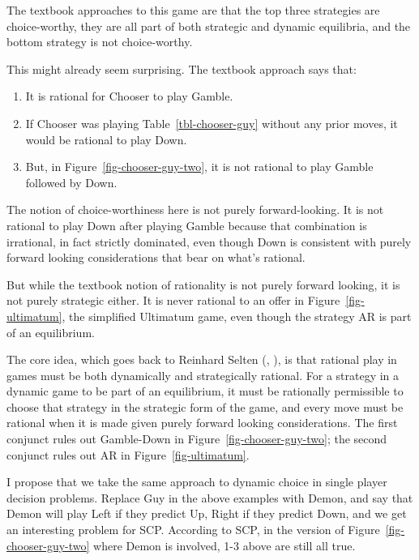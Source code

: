 \documentclass[
  11pt,
  letterpaper,
  DIV=11,
  numbers=noendperiod,
  twoside]{scrartcl}
\providecommand{\tightlist}{%
  \setlength{\itemsep}{0pt}\setlength{\parskip}{0pt}}
\begin{document}
The textbook approaches to this game are that the top three strategies
are choice-worthy, they are all part of both strategic and dynamic
equilibria, and the bottom strategy is not choice-worthy.

This might already seem surprising. The textbook approach says that:

\begin{enumerate}
\def\labelenumi{\arabic{enumi}.}
\tightlist
\item
  It is rational for Chooser to play Gamble.
\item
  If Chooser was playing Table~\ref{tbl-chooser-guy} without any prior
  moves, it would be rational to play Down.
\item
  But, in Figure~\ref{fig-chooser-guy-two}, it is not rational to play
  Gamble followed by Down.
\end{enumerate}

The notion of choice-worthiness here is not purely forward-looking. It
is not rational to play Down after playing Gamble because that
combination is irrational, in fact strictly dominated, even though Down
is consistent with purely forward looking considerations that bear on
what's rational.

But while the textbook notion of rationality is not purely forward
looking, it is not purely strategic either. It is never rational to an
offer in Figure~\ref{fig-ultimatum}, the simplified Ultimatum game, even
though the strategy AR is part of an equilibrium.

The core idea, which goes back to Reinhard Selten
(, ), is
that rational play in games must be both dynamically and strategically
rational. For a strategy in a dynamic game to be part of an equilibrium,
it must be rationally permissible to choose that strategy in the
strategic form of the game, and every move must be rational when it is
made given purely forward looking considerations. The first conjunct
rules out Gamble-Down in Figure~\ref{fig-chooser-guy-two}; the second
conjunct rules out AR in Figure~\ref{fig-ultimatum}.

I propose that we take the same approach to dynamic choice in single
player decision problems. Replace Guy in the above examples with Demon,
and say that Demon will play Left if they predict Up, Right if they
predict Down, and we get an interesting problem for SCP. According to
SCP, in the version of Figure~\ref{fig-chooser-guy-two} where Demon is
involved, 1-3 above are still all true.
\end{document}
